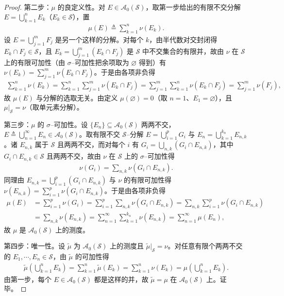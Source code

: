 \documentclass[../../main.tex]{subfiles}%
\begin{document}
\begin{proof}
第二步：$\mu$ 的良定义性。对 $E\in\mathcal{A}_0(\mathcal{S})$，取第一步给出的有限不交分解 $E=\bigcup_{k=1}^n E_k$（$E_k\in\mathcal{S}$），置
\begin{align*}
\mu(E)\triangleq\sum_{k=1}^n\nu(E_k).
\end{align*}
设 $E=\bigcup_{j=1}^m F_j$ 是另一个这样的分解。对每个 $k$，由半代数对交封闭得 $E_k\cap F_j\in\mathcal{S}$，且 $E_k=\bigcup_{j=1}^m(E_k\cap F_j)$ 是 $\mathcal{S}$ 中不交集合的有限并，故由 $\nu$ 在 $\mathcal{S}$ 上的有限可加性（由 $\sigma$--可加性把余项取为 $\varnothing$ 得到）有 $\nu(E_k)=\sum_{j=1}^m\nu(E_k\cap F_j)$。于是由各项非负得
\begin{align*}
\sum_{k=1}^n\nu(E_k)=\sum_{k=1}^n\sum_{j=1}^m\nu(E_k\cap F_j)=\sum_{j=1}^m\sum_{k=1}^n\nu(E_k\cap F_j)=\sum_{j=1}^m\nu(F_j),
\end{align*}
故 $\mu(E)$ 与分解的选取无关。由定义 $\mu(\varnothing )=0$（取 $n=1$、$E_1=\varnothing$），且 $\mu|_{\mathcal{S}}=\nu$（取单元素分解）。

第三步：$\mu$ 的 $\sigma$--可加性。设 $\{E_n\}\subseteq\mathcal{A}_0(\mathcal{S})$ 两两不交，$E\triangleq\bigcup_{n=1}^\infty E_n\in\mathcal{A}_0(\mathcal{S})$。取有限不交 $\mathcal{S}$--分解 $E=\bigcup_{i=1}^p G_i$ 与 $E_n=\bigcup_{k=1}^{k_n}E_{n,k}$。诸 $E_{n,k}$ 属于 $\mathcal{S}$ 且两两不交，而对每个 $i$ 有 $G_i=\bigcup_{n,k}(G_i\cap E_{n,k})$，其中 $G_i\cap E_{n,k}\in\mathcal{S}$ 且两两不交，故由 $\nu$ 在 $\mathcal{S}$ 上的 $\sigma$--可加性得
\begin{align*}
\nu(G_i)=\sum_{n,k}\nu(G_i\cap E_{n,k}).
\end{align*}
同理由 $E_{n,k}=\bigcup_{i=1}^p(G_i\cap E_{n,k})$ 与 $\nu$ 的有限可加性得 $\nu(E_{n,k})=\sum_{i=1}^p\nu(G_i\cap E_{n,k})$。于是由各项非负得
\begin{align*}
\mu(E)&=\sum_{i=1}^p\nu(G_i)=\sum_{i=1}^p\sum_{n,k}\nu(G_i\cap E_{n,k})=\sum_{n,k}\sum_{i=1}^p\nu(G_i\cap E_{n,k})\\
&=\sum_{n,k}\nu(E_{n,k})=\sum_{n=1}^\infty\sum_{k=1}^{k_n}\nu(E_{n,k})=\sum_{n=1}^\infty\mu(E_n),
\end{align*}
故 $\mu$ 是 $\mathcal{A}_0(\mathcal{S})$ 上的测度。

第四步：唯一性。设 $\widetilde{\mu}$ 为 $\mathcal{A}_0(\mathcal{S})$ 上的测度且 $\widetilde{\mu}|_{\mathcal{S}}=\nu$。对任意有限个两两不交的 $E_1,\cdots ,E_n\in\mathcal{S}$，由 $\widetilde{\mu}$ 的可加性得
\begin{align*}
\widetilde{\mu}\left(\bigcup_{k=1}^n E_k\right)=\sum_{k=1}^n\widetilde{\mu}(E_k)=\sum_{k=1}^n\nu(E_k)=\mu\left(\bigcup_{k=1}^n E_k\right).
\end{align*}
由第一步，每个 $E\in\mathcal{A}_0(\mathcal{S})$ 都是这样的并，故 $\widetilde{\mu}=\mu$ 在 $\mathcal{A}_0(\mathcal{S})$ 上。证毕。
\end{proof}
\end{document}

